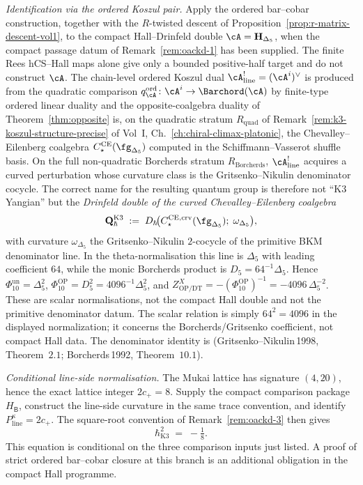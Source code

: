 \begin{remark}
\smallskip
\noindent\emph{Identification via the ordered Koszul pair.}
Apply the ordered bar--cobar construction, together with the
$R$-twisted descent of
Proposition~\ref{prop:r-matrix-descent-vol1}, to the compact
Hall--Drinfeld double $\cA = \mathbf{H}_{\Delta_5}$, when the compact
passage datum of Remark~\ref{rem:oackd-1} has been supplied. The finite Rees
hCS--Hall maps alone give only a bounded positive-half target and do
not construct $\cA$. The chain-level ordered Koszul dual
$\cA^!_{\mathrm{line}}=(\cA^i)^\vee$ is produced from the quadratic
comparison $q_\cA^{\mathrm{ord}}\colon\cA^i\to\Barchord(\cA)$ by
finite-type ordered linear duality and the opposite-coalgebra duality
of Theorem~\textup{\ref{thm:opposite}} is, on the
quadratic stratum $R_{\mathrm{quad}}$ of
Remark~\textup{\ref{rem:k3-koszul-structure-precise}} of
Vol~I, Ch.~\ref{ch:chiral-climax-platonic}, the Chevalley--Eilenberg
coalgebra $C^{\mathrm{CE}}_\star(\fg_{\Delta_5})$ computed in the
Schiffmann--Vasserot shuffle basis. On the full non-quadratic
Borcherds stratum $R_{\mathrm{Borcherds}}$, $\cA^!_{\mathrm{line}}$
acquires a curved perturbation whose curvature class is the
Gritsenko--Nikulin denominator cocycle. The correct name for the
resulting quantum group is therefore not ``K3 Yangian'' but the
\emph{Drinfeld double of the curved Chevalley--Eilenberg coalgebra}
\[
 \mathbf{Q}^{\mathrm{K3}}_{\hbar}
 \;:=\;
 D_\hbar\!\bigl(C^{\mathrm{CE},\mathrm{crv}}_\star(\fg_{\Delta_5});\;
 \omega_{\Delta_5}\bigr),
\]
with curvature $\omega_{\Delta_5}$ the Gritsenko--Nikulin $2$-cocycle of
the primitive BKM denominator line. In the theta-normalisation this line
is \(\Delta_5\) with leading
coefficient \(64\), while the monic Borcherds product is
\(D_5=64^{-1}\Delta_5\). Hence
\(\Phi_{10}^{\mathrm{un}}=\Delta_5^2\),
\(\Phi_{10}^{\mathrm{OP}}=D_5^2=4096^{-1}\Delta_5^2\), and
\(Z^{X}_{\mathrm{OP/DT}}=-(\Phi_{10}^{\mathrm{OP}})^{-1}
=-4096\,\Delta_5^{-2}\). These are scalar normalisations, not the
compact Hall double and not the primitive denominator datum. The
scalar relation is simply $64^2=4096$ in the displayed normalization;
it concerns the Borcherds/Gritsenko coefficient, not compact Hall
data. The
denominator identity is
\textup{(}Gritsenko--Nikulin\,1998, Theorem~$2.1$; Borcherds\,1992,
Theorem~$10.1$\textup{)}.

\smallskip
\noindent\emph{Conditional line-side normalisation.}
The Mukai lattice has signature $(4,20)$, hence the exact lattice
integer $2c_+=8$.  Supply the compact comparison package
$H_{\mathsf B}$, construct the line-side curvature in the same trace
convention, and identify
$P^\kappa_{\mathrm{line}}=2c_+$.  The square-root convention of
Remark~\textup{\ref{rem:oackd-3}} then gives
\[
 \hbar^{2}_{\mathrm{K3}} \;=\; -\tfrac{1}{8}.
\]
This equation is conditional on the three comparison inputs just
listed.  A proof of strict ordered bar--cobar closure at this branch is
an additional obligation in the compact Hall programme.


\end{remark}
